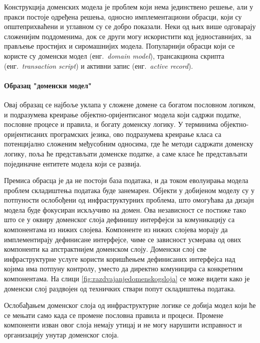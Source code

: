 \documentclass[12pt,oneside]{memoir}
\begin{document}
Конструкција доменских модела је проблем који нема јединствено решење, али у пракси постоје одређена решења, односно имплементациони обрасци, који су општеприхваћени и углавном су се добро показали. Неки од њих више одговарају сложенијим поддоменима, док се други могу искористити код једноставнијих, за прављење простијих и сиромашнијих модела. Популарнији обрасци који се користе су доменски модел (енг.~\textit{domain model}), трансакциона скрипта (енг.~\textit{transaction script}) и активни запис (енг.~\textit{active record})\cite{peaa}.

\paragraph{Образац "доменски модел"}
Овај образац се најбоље уклапа у сложене домене са богатом пословном логиком, и подразумева креирање објектно-оријентисаног модела који садржи податке, пословне процесе и правила, и богату доменску логику. У терминима објектно-оријентисаних програмских језика, ово подразумева креирање класа са потенцијално сложеним међусобним односима, где ће методи садржати доменску логику, поља ће представљати доменске податке, а саме класе ће представљати појединачне ентитете модела који се развија.

Премиса обрасца је да не постоји база података, и да током еволуирања модела проблем складиштења података буде занемарен. Објекти у добијеном моделу су у потпуности ослобођени од инфраструктурних проблема, што омогућава да дизајн модела буде фокусиран искључиво на домен. Ова независност се постиже тако што се у оквиру доменског слоја дефинишу интерфејси за комуникацију са компонентама из нижих слојева. Компоненте из нижих слојева морају да имплементирају дефинисане интерфејсе, чиме се зависност усмерава од ових компоненти ка апстрактнијем доменском слоју. Доменски слој све инфраструктурне услуге користи коришћењем дефинисаних интерфејса над којима има потпуну контролу, уместо да директно комуницира са конкретним компонентама. На слици \ref{fig:razdvajanjedomenskogsloja} се може видети како је доменски слој раздвојен од техничких ствари попут складиштења података.

Ослобађањем доменског слоја од инфраструктурне логике се добија модел који ће се мењати само када се промене пословна правила и процеси. Промене компоненти изван овог слоја немају утицај и не могу нарушити исправност и организацију унутар доменског слоја.
\end{document}

